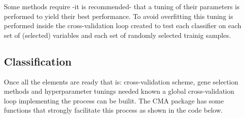\documentclass{article}\usepackage[]{graphicx}\usepackage[]{color}
\begin{document}
Some methods require -it is recommended- that a tuning of their parameters is performed to yield their best performance.
To avoid overfitting this tuning is performed inside the cross-validation loop created to test each classifier on each set of (selected) variables and each set of randomly selected trainig samples.

\subsection{Classification}

Once all the elements are ready that is: cross-validation scheme, gene selection methods and hyperparameter tunings needed known a global cross-validation loop implementing the process can be builit. The CMA package has some functions that strongly facilitate this process as shown in the code below.
\end{document}
